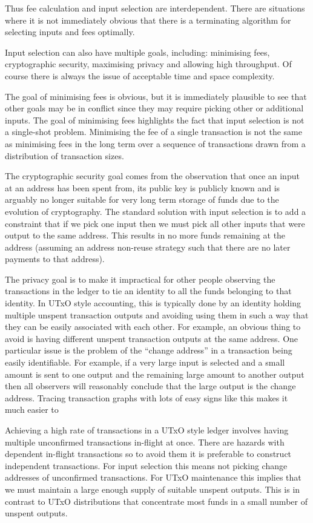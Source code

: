 \documentclass{article}
\begin{document}
Thus fee calculation and input selection are interdependent. There are
situations where it is not immediately obvious that there is a terminating
algorithm for selecting inputs and fees optimally.

Input selection can also have multiple goals, including: minimising fees,
cryptographic security, maximising privacy and allowing high throughput. Of
course there is always the issue of acceptable time and space complexity.

The goal of minimising fees is obvious, but it is immediately plausible to see
that other goals may be in conflict since they may require picking other or
additional inputs. The goal of minimising fees highlights the fact that input
selection is not a single-shot problem. Minimising the fee of a single
transaction is not the same as minimising fees in the long term over a
sequence of transactions drawn from a distribution of transaction sizes.

The cryptographic security goal comes from the observation that once an input
at an address has been spent from, its public key is publicly known and is
arguably no longer suitable for very long term storage of funds due to the
evolution of cryptography. The standard solution with input selection is to add
a constraint that if we pick one input then we must pick all other inputs that
were output to the same address. This results in no more funds remaining at the
address (assuming an address non-reuse strategy such that there are no later
payments to that address).

The privacy goal is to make it impractical for other people observing the
transactions in the ledger to tie an identity to all the funds belonging to
that identity. In UTxO style accounting, this is typically done by an identity
holding multiple unspent transaction outputs and avoiding using them in such a
way that they can be easily associated with each other. For example, an obvious
thing to avoid is having different unspent transaction outputs at the same
address. One particular issue is the problem of the ``change address'' in a
transaction being easily identifiable. For example, if a very large input is
selected and a small amount is sent to one output and the remaining large
amount to another output then all observers will reasonably conclude that the
large output is the change address. Tracing transaction graphs with lots of
easy signs like this makes it much easier to

Achieving a high rate of transactions in a UTxO style ledger involves having
multiple unconfirmed transactions in-flight at once. There are hazards with
dependent in-flight transactions so to avoid them it is preferable to construct
independent transactions. For input selection this means not picking change
addresses of unconfirmed transactions. For UTxO maintenance this implies that
we must maintain a large enough supply of suitable unspent outputs. This is in
contrast to UTxO distributions that concentrate most funds in a small number of
unspent outputs.
\end{document}
